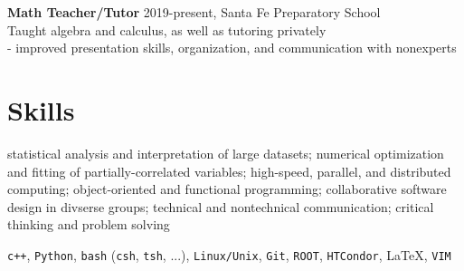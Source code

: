 \documentclass[letterpaper,12pt]{article} %
\begin{document}
 {\large {\bf Math Teacher/Tutor} 2019-present, Santa Fe Preparatory School} \\
 Taught algebra and calculus, as well as tutoring privately \\
- improved presentation skills, organization, and communication with nonexperts 

\section{Skills}
statistical analysis and interpretation of large datasets; numerical optimization and fitting of partially-correlated variables; high-speed, parallel, and distributed computing; object-oriented and functional programming; collaborative software design in divserse groups; technical and nontechnical communication; critical thinking and problem solving

\texttt{c++}, \texttt{Python}, \texttt{bash} (\texttt{csh}, \texttt{tsh}, ...), \texttt{Linux/Unix}, \texttt{Git}, \texttt{ROOT}, \texttt{HTCondor}, \LaTeX, \texttt{VIM}
\end{document}
